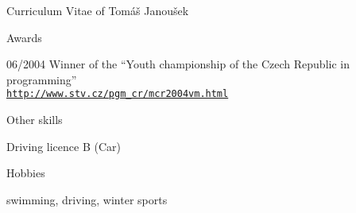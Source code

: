 \documentclass[12pt,a4paper,english,pdftex]{article}
\begin{document}
\begin{cv}{Curriculum Vitae of Tomáš Janoušek}
    \begin{cvlist}{Awards}
        \item[06/2004]
            Winner of the ``Youth championship of the Czech Republic in
            programming'' \\
            \href{http://www.stv.cz/pgm_cr/mcr2004vm.html}{\texttt{http://www.stv.cz/pgm\_cr/mcr2004vm.html}}
    \end{cvlist}

    \begin{cvlist}{Other skills}
        \item[Driving licence] B (Car)
    \end{cvlist}

    \begin{cvlist}{Hobbies}
        \item swimming, driving, winter sports
    \end{cvlist}

    \enlargethispage{0.3cm}
    \date{\today}
\end{cv}
\end{document}
